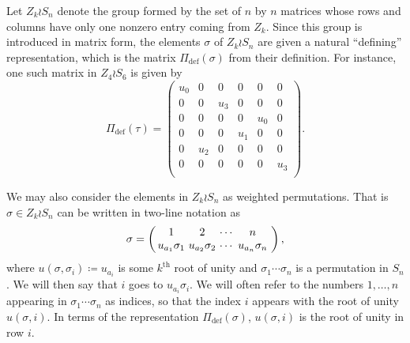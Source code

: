 \documentclass[a4paper,12pt]{amsart}
\theoremstyle{plain}
\theoremstyle{definition}
\theoremstyle{remark}
\DeclareMathOperator{\defining}{def}
\begin{document}
Let $Z_k \wr S_n$ denote the group formed by the set of $n$ by $n$ matrices whose rows and columns have only one nonzero entry coming from $Z_k$. Since this group is introduced in matrix form, the elements $\sigma$ of $Z_k \wr S_n$ are given a natural ``defining'' representation, which is the matrix $\Pi_{\defining}(\sigma)$ from their definition.
For instance, one such matrix in $Z_4 \wr S_6$ is given by
\begin{equation*} \Pi_{\defining}(\tau) = 
 \begin{pmatrix}
 u_0 & 0 & 0 & 0 & 0 & 0 \\
 0 & 0 & u_3 & 0 & 0 & 0 \\
 0 & 0 & 0 & 0 & u_0 & 0 \\
 0 & 0 & 0 & u_1 & 0 & 0 \\
 0 & u_2 & 0 & 0 & 0 & 0 \\
 0 & 0 & 0 & 0 & 0 & u_3 \\  
 \end{pmatrix}.
\end{equation*}

 We may also consider the elements in $Z_k \wr S_n$ as weighted permutations. That is $\sigma \in Z_k \wr S_n$ can be written in two-line notation as
 \begin{equation*}
 \sigma = \left(\begin{array}{@{\,}c@{\ }c@{\ }c@{\ }c@{\ }}
1&2&\cdots&n\\
u_{a_1} \sigma_1&u_{a_2}\sigma_2&\cdots&u_{a_n}\sigma_n
\end{array}\right),
\end{equation*}
where $u(\sigma, \sigma_i) \coloneq u_{a_i}$ is some $k^{\text{th}}$ root of unity and $\sigma_1 \cdots \sigma_n$ is a permutation in $S_n$. We will then say that $i$ goes to $u_{a_i} \sigma_i$.
We will often refer to the numbers $1,\dots,n$ appearing in $\sigma_1\cdots \sigma_n$ as indices, so that the index $i$ appears with the root of unity $u(\sigma,i).$
In terms of the representation $\Pi_{\defining}(\sigma)$, $u(\sigma,i)$ is the root of unity in row $i$.
\\
\end{document}
